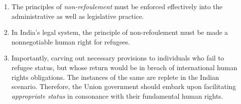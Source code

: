 \begin{multicols}{2}
\begin{enumerate}[label=$\bullet$]
\item The principles of \textit{non-refoulement} must be enforced effectively into the administrative
as well as legislative practice.

\item In India's legal system, the principle of non-refoulement must be made a nonnegotiable human right for refugees.

\item Importantly, carving out necessary provisions to individuals who fail to refugee status,
but whose return would be in breach of international human rights obligations. The
instances of the same are replete in the Indian scenario. Therefore, the Union
government should embark upon facilitating \textit{appropriate status} in consonance with
their fundamental human rights.
\end{enumerate}

\end{multicols}
